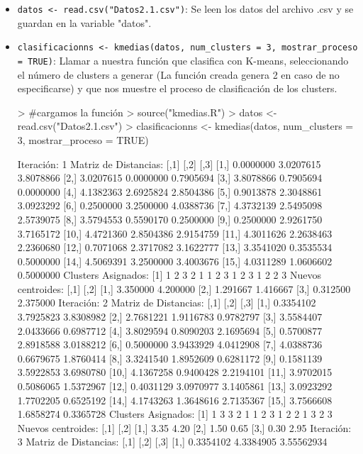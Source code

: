 \documentclass[a4paper, 12pt]{article}
\begin{document}
	\begin{itemize}
		\item \texttt{datos <- read.csv("Datos2.1.csv")}: Se leen los datos del archivo .csv y se guardan en la variable "datos".
		\item \texttt{clasificacionns <- kmedias(datos, num\_clusters = 3, mostrar\_proceso = TRUE)}: Llamar a nuestra función que clasifica con K-means, seleccionando el número de clusters a generar (La función creada genera 2 en caso de no especificarse) y que nos muestre el proceso de clasificación de los clusters.
	
\begin{Schunk}
\begin{Sinput}
> #cargamos la función
> source("kmedias.R")
> datos <- read.csv("Datos2.1.csv")
> clasificacionns <- kmedias(datos, num_clusters = 3, mostrar_proceso = TRUE)
\end{Sinput}
\begin{Soutput}
Iteración:  1 
Matriz de Distancias:
           [,1]      [,2]      [,3]
 [1,] 0.0000000 3.0207615 3.8078866
 [2,] 3.0207615 0.0000000 0.7905694
 [3,] 3.8078866 0.7905694 0.0000000
 [4,] 4.1382363 2.6925824 2.8504386
 [5,] 0.9013878 2.3048861 3.0923292
 [6,] 0.2500000 3.2500000 4.0388736
 [7,] 4.3732139 2.5495098 2.5739075
 [8,] 3.5794553 0.5590170 0.2500000
 [9,] 0.2500000 2.9261750 3.7165172
[10,] 4.4721360 2.8504386 2.9154759
[11,] 4.3011626 2.2638463 2.2360680
[12,] 0.7071068 2.3717082 3.1622777
[13,] 3.3541020 0.3535534 0.5000000
[14,] 4.5069391 3.2500000 3.4003676
[15,] 4.0311289 1.0606602 0.5000000
Clusters Asignados:
 [1] 1 2 3 2 1 1 2 3 1 2 3 1 2 2 3
Nuevos centroides: 
         [,1]     [,2]
[1,] 3.350000 4.200000
[2,] 1.291667 1.416667
[3,] 0.312500 2.375000
Iteración:  2 
Matriz de Distancias:
           [,1]      [,2]      [,3]
 [1,] 0.3354102 3.7925823 3.8308982
 [2,] 2.7681221 1.9116783 0.9782797
 [3,] 3.5584407 2.0433666 0.6987712
 [4,] 3.8029594 0.8090203 2.1695694
 [5,] 0.5700877 2.8918588 3.0188212
 [6,] 0.5000000 3.9433929 4.0412908
 [7,] 4.0388736 0.6679675 1.8760414
 [8,] 3.3241540 1.8952609 0.6281172
 [9,] 0.1581139 3.5922853 3.6980780
[10,] 4.1367258 0.9400428 2.2194101
[11,] 3.9702015 0.5086065 1.5372967
[12,] 0.4031129 3.0970977 3.1405861
[13,] 3.0923292 1.7702205 0.6525192
[14,] 4.1743263 1.3648616 2.7135367
[15,] 3.7566608 1.6858274 0.3365728
Clusters Asignados:
 [1] 1 3 3 2 1 1 2 3 1 2 2 1 3 2 3
Nuevos centroides: 
     [,1] [,2]
[1,] 3.35 4.20
[2,] 1.50 0.65
[3,] 0.30 2.95
Iteración:  3 
Matriz de Distancias:
           [,1]      [,2]       [,3]
 [1,] 0.3354102 4.3384905 3.55562934

\end{Soutput}
\end{Schunk}
\end{itemize}
\end{document}
